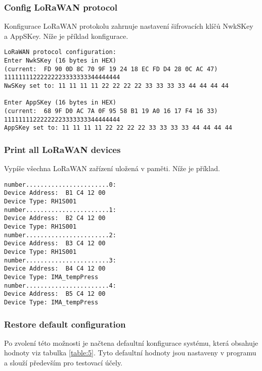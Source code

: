 \subsubsection{Config LoRaWAN protocol}
Konfigurace LoRaWAN protokolu zahrnuje nastavení šifrovacích klíčů NwkSKey a AppSKey. Níže je příklad konfigurace.

\begin{lstlisting}
LoRaWAN protocol configuration:
Enter NwkSKey (16 bytes in HEX)
(current:  FD 90 0D 8C 70 9F 19 24 18 EC FD D4 28 0C AC 47)
11111111222222223333333344444444
NwSKey set to: 11 11 11 11 22 22 22 22 33 33 33 33 44 44 44 44

Enter AppSKey (16 bytes in HEX)
(current:  68 9F D0 AC 7A 0F 95 58 B1 19 A0 16 17 F4 16 33)
11111111222222223333333344444444
AppSKey set to: 11 11 11 11 22 22 22 22 33 33 33 33 44 44 44 44
\end{lstlisting}


\subsubsection{Print all LoRaWAN devices}
Vypíše všechna LoRaWAN zařízení uložená v paměti. Níže je příklad.


\begin{lstlisting}
number.......................0:
Device Address:  B1 C4 12 00
Device Type: RH1S001
number.......................1:
Device Address:  B2 C4 12 00
Device Type: RH1S001
number.......................2:
Device Address:  B3 C4 12 00
Device Type: RH1S001
number.......................3:
Device Address:  B4 C4 12 00
Device Type: IMA_tempPress
number.......................4:
Device Address:  B5 C4 12 00
Device Type: IMA_tempPress
\end{lstlisting}



\subsubsection{Restore default configuration}
Po zvolení této možnosti je načtena defaultní konfigurace systému, která obsahuje hodnoty viz tabulka \ref{table:5}. Tyto defaultní hodnoty jsou nastaveny v programu a slouží především pro testovací účely.

